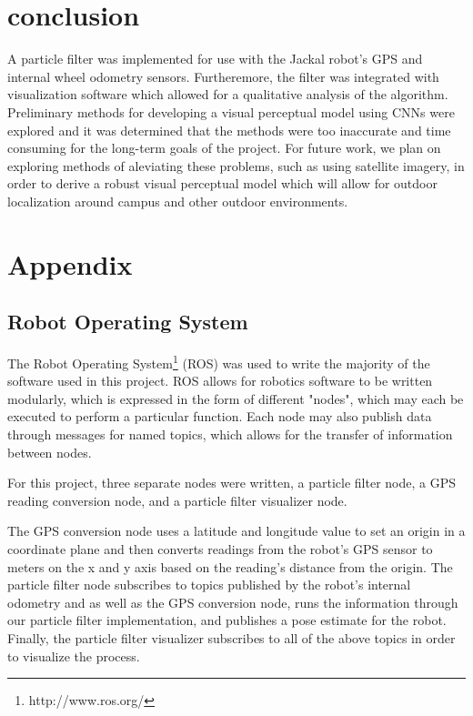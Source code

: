 \documentclass[letterpaper, 12 pt, conference]{ieeeconf}  %
\begin{document}
\section{conclusion}

A particle filter was implemented for use with the Jackal robot's GPS and internal wheel odometry sensors. Furtheremore, the filter was integrated with visualization software which allowed for a qualitative analysis of the algorithm. Preliminary methods for developing a visual perceptual model using CNNs were explored and it was determined that the methods were too inaccurate and time consuming for the long-term goals of the project. For future work, we plan on exploring methods of aleviating these problems, such as using satellite imagery, in order to derive a robust visual perceptual model which will allow for outdoor localization around campus and other outdoor environments. 




\section*{Appendix}

\subsection{Robot Operating System}

The Robot Operating System\footnote{http://www.ros.org/} (ROS) was used to write the majority of the software used in this project. ROS allows for robotics software to be written modularly, which is expressed in the form of different "nodes", which may each be executed to perform a particular function. Each node may also publish data through messages for named topics, which allows for the transfer of information between nodes. 
\par
For this project, three separate nodes were written, a particle filter node, a GPS reading conversion node, and a particle filter visualizer node. 
\par
The GPS conversion node uses a latitude and longitude value to set an origin in a coordinate plane and then converts readings from the robot's GPS sensor to meters on the x and y axis based on the reading's distance from the origin. The particle filter node subscribes to topics published by the robot's internal odometry and as well as the GPS conversion node, runs the information through our particle filter implementation, and publishes a pose estimate for the robot. Finally, the particle filter visualizer subscribes to all of the above topics in order to visualize the process. 
\end{document}

